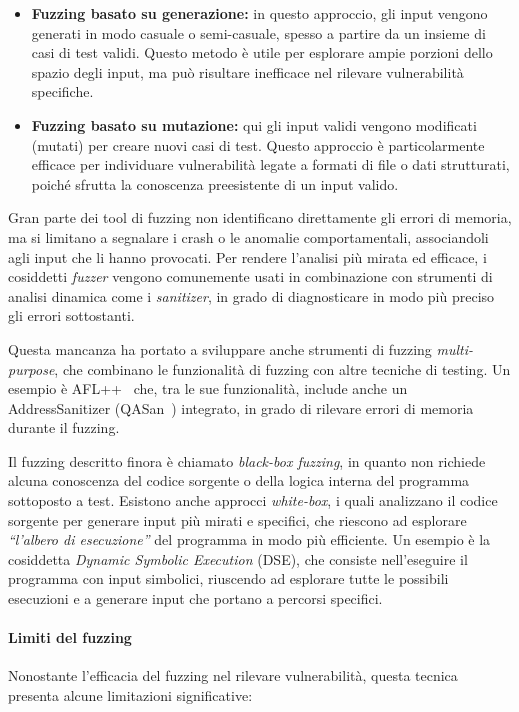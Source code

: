 \begin{itemize}
  \item \textbf{Fuzzing basato su generazione:} in questo approccio, gli input vengono
    generati in modo casuale o semi-casuale, spesso a partire da un insieme di
    casi di test validi. Questo metodo è utile per esplorare ampie porzioni dello
    spazio degli input, ma può risultare inefficace nel rilevare vulnerabilità
    specifiche.

  \item \textbf{Fuzzing basato su mutazione:} qui gli input validi vengono
    modificati (mutati) per creare nuovi casi di test. Questo approccio è particolarmente
    efficace per individuare vulnerabilità legate a formati di file o dati strutturati,
    poiché sfrutta la conoscenza preesistente di un input valido.
\end{itemize}

Gran parte dei tool di fuzzing non identificano direttamente gli errori di
memoria, ma si limitano a segnalare i crash o le anomalie comportamentali,
associandoli agli input che li hanno provocati. Per rendere l'analisi più mirata
ed efficace, i cosiddetti \textit{fuzzer} vengono comunemente usati in combinazione
con strumenti di analisi dinamica come i \textit{sanitizer}, in grado di diagnosticare
in modo più preciso gli errori sottostanti.

Questa mancanza ha portato a sviluppare anche strumenti di fuzzing \textit{multi-purpose},
che combinano le funzionalità di fuzzing con altre tecniche di testing. Un
esempio è AFL++~\cite{afl_plus_plus} che, tra le sue funzionalità, include anche
un AddressSanitizer (QASan~\cite{qasan}) integrato, in grado di rilevare errori di
memoria durante il fuzzing.

Il fuzzing descritto finora è chiamato \textit{black-box fuzzing}, in quanto non
richiede alcuna conoscenza del codice sorgente o della logica interna del programma
sottoposto a test. Esistono anche approcci \textit{white-box}, i quali
analizzano il codice sorgente per generare input più mirati e specifici, che riescono
ad esplorare \textit{``l'albero di esecuzione''} del programma in modo più
efficiente. Un esempio è la cosiddetta \textit{Dynamic Symbolic Execution} (DSE),
che consiste nell'eseguire il programma con input simbolici, riuscendo ad
esplorare tutte le possibili esecuzioni e a generare input che portano a
percorsi specifici.

\paragraph{Limiti del fuzzing}
Nonostante l'efficacia del fuzzing nel rilevare vulnerabilità, questa tecnica
presenta alcune limitazioni significative:

